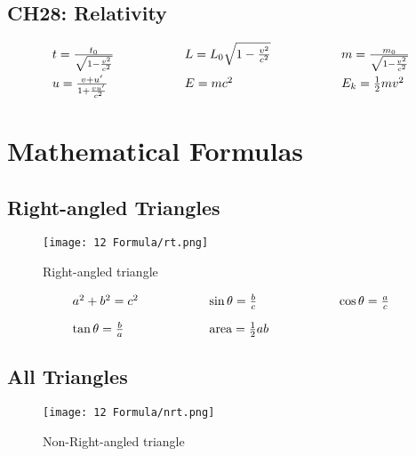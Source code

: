 \documentclass[12pt,a4paper]{article}
\begin{document}
\subsection{CH28: Relativity}
\begin{align*}
  \begin{array}{l@{\hspace{2cm}}l@{\hspace{2cm}}l}
    t = \frac{t_0}{\sqrt{1-\frac{v^2}{c^2}}} & L = L_0\sqrt{1-\frac{v^2}{c^2}} & m = \frac{m_0}{\sqrt{1-\frac{v^2}{c^2}}} \\[1em]
    u = \frac{v+u'}{1+\frac{vu'}{c^2}} & E = mc^2 & E_k = \frac{1}{2}mv^2
  \end{array}
\end{align*}


\fi


\newpage
\section{Mathematical Formulas}

\subsection{Right-angled Triangles}

\begin{figure}[H]
    \centering
    \texttt{[image: 12 Formula/rt.png]}
    \caption{Right-angled triangle}
    \label{fig:Right-angled triangle}
\end{figure}

\begin{align*}
  \begin{array}{l@{\hspace{2cm}}l@{\hspace{2cm}}l}
    a^2 + b^2 = c^2 & \sin \theta = \frac{b}{c} & \cos \theta = \frac{a}{c} \\[1em]
    \tan \theta = \frac{b}{a} & \text{area} = \frac{1}{2}ab &
  \end{array}
\end{align*}

\subsection{All Triangles}
\begin{figure}[H]
    \centering
    \texttt{[image: 12 Formula/nrt.png]}
    \caption{Non-Right-angled triangle}
    \label{fig:Non-Right-angled triangle}
\end{figure}
\end{document}
